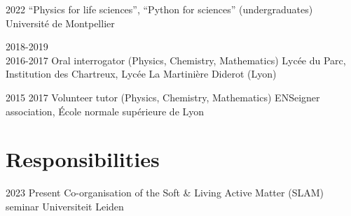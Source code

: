 \documentclass[a4paper]{cvtemplate_en} %
\begin{document}
\begin{cvbody}

\cvitem
	{2022}
	{}
	{``Physics for life sciences'', ``Python for sciences'' (undergraduates)}
	{Université de Montpellier \vspace{-5pt}}
	{}{}{}
	{}
	{\vspace{5pt}}

\cvitem
	{2018-2019\\ \mbox{}\hfill 2016-2017}
	{}
	{Oral interrogator (Physics, Chemistry, Mathematics)}
	{Lyc\'ee du Parc, Institution des Chartreux, Lyc\'ee La Martinière Diderot (Lyon) }
	{}{}{}
	{}
	{\vspace{5pt}
	}


\cvitem
	{2015}
	{2017}
	{Volunteer tutor (Physics, Chemistry, Mathematics)}
	{ENSeigner association, \'Ecole normale sup\'erieure de Lyon }
	{}{}{}
	{}
	{\vspace{5pt}
	}

\end{cvbody}


\section{Responsibilities}

\begin{cvbody}

\cvitem
	{2023}
	{Present}
	{Co-organisation of the Soft \& Living Active Matter (SLAM) seminar}
	{Universiteit Leiden \vspace{-5pt}}
	{}{}{}
	{}
	{\vspace{5pt}}

\end{cvbody}
\end{document}
